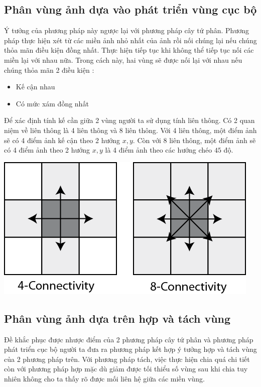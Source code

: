 \documentclass[14pt,oneside,a4paper]{extreport}
\begin{document}
\subsection{Phân vùng ảnh dựa vào phát triển vùng cục bộ}
Ý tưởng của phương pháp này ngược lại với phương pháp cây tứ phân. Phương pháp thực hiện xét từ các miền ảnh nhỏ nhất của ảnh rồi nối chúng lại nếu chúng thỏa mãn điều kiện đồng nhất. Thực hiện tiếp tục khi không thể tiếp tục nối các miền lại với nhau nữa.
Trong cách này, hai vùng sẽ được nối lại với nhau nếu chúng thỏa mãn 2 điều kiện :
\begin{itemize}
\item Kế cận nhau
\item Có mức xám đồng nhất
\end{itemize}

Để xác định tính kế cần giữa 2 vùng người ta sử dụng tính liên thông. Có 2 quan niệm về liên thông là 4 liên thông và 8 liên thông. Với 4 liên thông,  một điểm ảnh sẽ có 4 điểm ảnh kế cận theo 2 hướng $x,y$. Còn với 8 liên thông, một điểm ảnh sẽ có 4 điểm ảnh theo 2 hướng $x,y$ là 4 điểm ảnh theo các hướng chéo $45$ độ.
\begin{center}
\includegraphics[scale=0.7]{figure/4-8-connectivity.png}
\end{center}
\subsection{Phân vùng ảnh dựa trên hợp và tách vùng}
Đề khắc phục được nhược điểm của 2 phương pháp cây tứ phân và phương pháp phát triển cục bộ người ta đưa ra phương pháp kết hợp ý tưởng hợp và tách vùng của 2 phương pháp trên. Với phương pháp tách, việc thực hiện chia quá chi tiết còn với phương pháp hợp mặc dù giảm được tối thiểu số vùng sau khi chia tuy nhiên không cho ta thấy rõ được mối liên hệ giữa các miền vùng.
\end{document}
